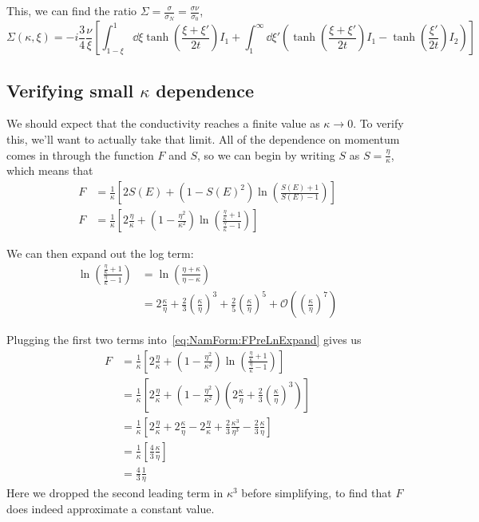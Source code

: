 \documentclass[11pt]{article}
\begin{document}
This, we can find the ratio $\Sigma = \frac{\sigma}{\sigma_N} = \frac{\sigma \nu}{\sigma_0}$,
\begin{equation}
	\Sigma(\kappa, \xi) = -i \frac{3}{4} \frac{\nu}{\xi}\left[\int_{1 - \xi}^{1}\dd{\xi} \tanh(\frac{\xi + \xi'}{2 t}) I_1 + \int_{1}^{\infty} \dd{\xi'} \left( \tanh(\frac{\xi + \xi'}{2t}) I_1  - \tanh(\frac{\xi'}{2t})I_2 \right) \right]
\end{equation}


\subsection{Verifying small $\kappa$ dependence} \label{subsec:NamForm.SmallK}
We should expect that the conductivity reaches a finite value as $\kappa \rightarrow 0$.
To verify this, we'll want to actually take that limit.
All of the dependence on momentum comes in through the function $F$ and $S$, so we can begin by writing $S$ as $S = \frac{\eta}{\kappa}$, which means that
\begin{align}
	F &= \frac{1}{\kappa} \left[2 S(E) + (1 - S(E)^2)\ln(\frac{S(E) + 1}{S(E) - 1})\right] \\
	F &= \frac{1}{\kappa} \left[2 \frac{\eta}{\kappa} + (1 - \frac{\eta^2}{\kappa^2})\ln(\frac{\frac{\eta}{\kappa} + 1}{\frac{\eta}{\kappa} - 1})\right] \label{eq:NamForm:FPreLnExpand}
\end{align}

We can then expand out the log term:
\begin{align}
	\ln(\frac{\frac{\eta}{\kappa} + 1}{\frac{\eta}{\kappa} - 1}) &= \ln(\frac{\eta + \kappa}{\eta - \kappa}) \\
	&= 2 \frac{\kappa}{\eta} + \frac23 \left(\frac{\kappa}{\eta}\right)^3 + \frac25 \left(\frac{\kappa}{\eta}\right)^5 + \mathcal{O}\left(\left(\frac{\kappa}{\eta}\right)^7\right)
\end{align}

Plugging the first two terms into~\eqref{eq:NamForm:FPreLnExpand} gives us
\begin{align}
	F &= \frac{1}{\kappa} \left[2 \frac{\eta}{\kappa} + (1 - \frac{\eta^2}{\kappa^2})\ln(\frac{\frac{\eta}{\kappa} + 1}{\frac{\eta}{\kappa} - 1})\right] \\
	&= \frac{1}{\kappa} \left[2 \frac{\eta}{\kappa} + (1 - \frac{\eta^2}{\kappa^2})\left(2 \frac{\kappa}{\eta} + \frac23 \left(\frac{\kappa}{\eta}\right)^3\right)\right] \\
	&= \frac{1}{\kappa} \left[2 \frac{\eta}{\kappa} + 2\frac{\kappa}{\eta} - 2 \frac{\eta}{\kappa} + \frac23 \frac{\kappa^3}{\eta^3} - \frac23 \frac{\kappa}{\eta}\right] \\
	&= \frac{1}{\kappa} \left[\frac43\frac{\kappa}{\eta}\right] \\
	&= \frac43 \frac{1}{\eta}
\end{align}
Here we dropped the second leading term in $\kappa^3$ before simplifying, to find that $F$ does indeed approximate a constant value.
\end{document}
